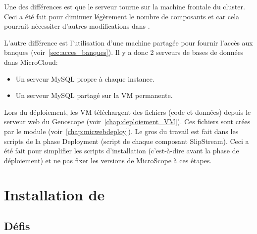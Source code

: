 Une des différences est que le serveur  tourne
sur la machine frontale du cluster.
Ceci a été fait pour diminuer légèrement le nombre de composants
et car cela pourrait nécessiter d'autres modifications dans .

L'autre différence est l'utilisation d'une machine partagée pour fournir l'accès aux banques (voir~\autoref{sec:acces_banques}).
Il y a donc 2 serveurs de bases de données dans MicroCloud:
\begin{itemize}
    \item Un serveur MySQL propre à chaque instance.
    \item Un serveur MySQL partagé sur la VM permanente.
\end{itemize}\vspace*{\baselineskip}

Lors du déploiement, les VM téléchargent des fichiers (code et données) depuis le serveur web du Genoscope (voir~\autoref{chap:deploiement_VM}).
Ces fichiers sont crées par le module \micWEBdeployVer{} (voir~\autoref{chap:micwebdeploy}).
Le gros du travail est fait dans les scripts de la phase Deployment (script  de chaque composant SlipStream).
Ceci a été fait pour simplifier les scripts d'installation (c'est-à-dire avant la phase de déploiement)
et ne pas fixer les versions de MicroScope à ces étapes.

\section{Installation de } \label{sec:installation_jbpmmicroscope}

\subsection{Défis}

